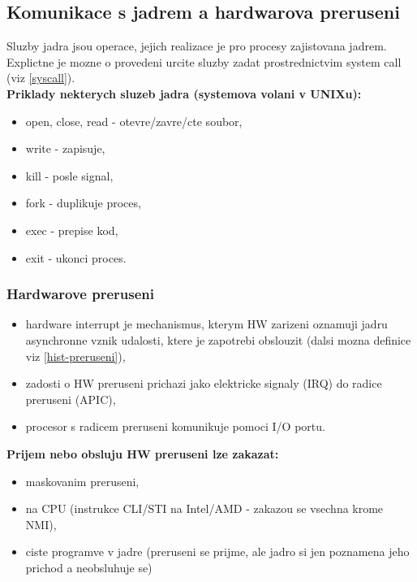 \documentclass[a4paper, 11pt]{article}
\begin{document}
\newpage

\subsection{Komunikace s jadrem a hardwarova preruseni} \label{hw-preruseni}
Sluzby jadra jsou operace, jejich realizace je pro procesy zajistovana jadrem. Explictne je mozne o provedeni urcite sluzby zadat prostrednictvim system call (viz \ref{syscall}). \\

\noindent\textbf{Priklady nekterych sluzeb jadra (systemova volani v UNIXu):}
\begin{itemize}
    \item open, close, read - otevre/zavre/cte soubor,
    \item write - zapisuje,
    \item kill - posle signal,
    \item fork - duplikuje proces,
    \item exec - prepise kod,
    \item exit - ukonci proces. \\
\end{itemize}

\subsubsection{Hardwarove preruseni}
\begin{itemize}
    \item hardware interrupt je mechanismus, kterym HW zarizeni oznamuji jadru asynchronne vznik udalosti, ktere je zapotrebi obslouzit (dalsi mozna definice viz \ref{hist-preruseni}),
    \item zadosti o HW preruseni prichazi jako elektricke signaly (IRQ) do radice preruseni (APIC),
    \item procesor s radicem preruseni komunikuje pomoci I/O portu. \\
\end{itemize}

\noindent\textbf{Prijem nebo obsluju HW preruseni lze zakazat:}
\begin{itemize}
    \item maskovanim preruseni, 
    \item na CPU (instrukce CLI/STI na Intel/AMD - zakazou se vsechna krome NMI),
    \item ciste programve v jadre (preruseni se prijme, ale jadro si jen poznamena jeho prichod a neobsluhuje se) \\
\end{itemize}
\end{document}
